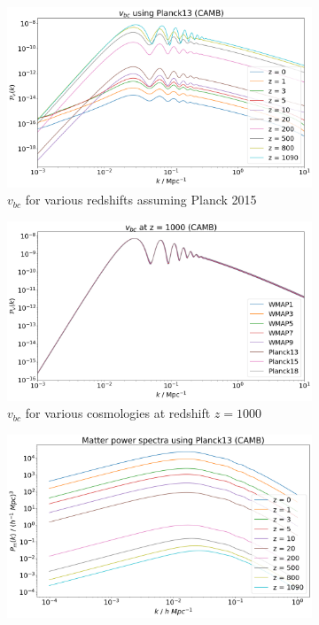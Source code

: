 \documentclass[floats,floatfix,showpacs,amssymb,prd,superscriptaddress,nofootinbib]{revtex4-2} %
\begin{document}
\begin{figure}[!htbp]
     \centering
     \begin{subfigure}{0.45\textwidth}
         \centering
         \includegraphics[width=\textwidth]{images/vbc_varied_redshift.png}
         \caption{$v_{bc}$ for various redshifts assuming Planck 2015}
         \label{fig:vbc_varied_redshift}
     \end{subfigure}
     \hfill
     \begin{subfigure}{0.45\textwidth}
         \centering
         \includegraphics[width=\textwidth]{images/vbc_varied_cosmology.png}
         \caption{$v_{bc}$ for various cosmologies at redshift $z = 1000$}
         \label{fig:vbc_varied_cosmology}
     \end{subfigure}
     \centering
     \begin{subfigure}{0.45\textwidth}
         \centering
         \includegraphics[width=\textwidth]{images/matter_power_spectrum_varied_redshift.png}

\end{subfigure}
\end{figure}
\end{document}
